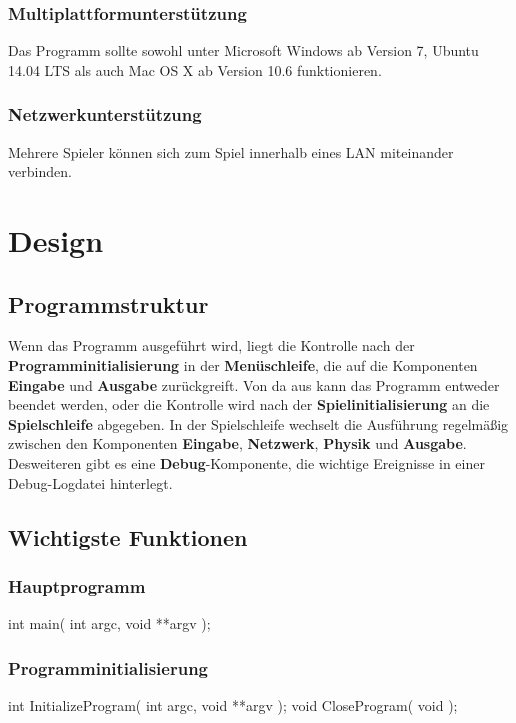 \documentclass{homework-pp}
\begin{document}
\subsubsection{Multiplattformunterstützung}
Das Programm sollte sowohl unter Microsoft Windows ab Version 7, Ubuntu 14.04 LTS als auch Mac OS X ab Version 10.6 funktionieren.
\subsubsection{Netzwerkunterstützung}
Mehrere Spieler können sich zum Spiel innerhalb eines LAN miteinander verbinden.

\section{Design}

\subsection{Programmstruktur}
Wenn das Programm ausgeführt wird, liegt die Kontrolle nach der \textbf{Programminitialisierung} in der \textbf{Menüschleife}, die auf die Komponenten \textbf{Eingabe} und \textbf{Ausgabe} zurückgreift. Von da aus kann das Programm entweder beendet werden, oder die Kontrolle wird nach der \textbf{Spielinitialisierung} an die \textbf{Spielschleife} abgegeben. In der Spielschleife wechselt die Ausführung regelmäßig zwischen den Komponenten \textbf{Eingabe}, \textbf{Netzwerk}, \textbf{Physik} und \textbf{Ausgabe}. Desweiteren gibt es eine \textbf{Debug}-Komponente, die wichtige Ereignisse in einer Debug-Logdatei hinterlegt.

\subsection{Wichtigste Funktionen}
\subsubsection{Hauptprogramm}

\begin{cblock}
int main( int argc, void **argv );
\end{cblock}

\subsubsection{Programminitialisierung}

\begin{cblock}
int InitializeProgram( int argc, void **argv );
void CloseProgram( void );
\end{cblock}
\end{document}
